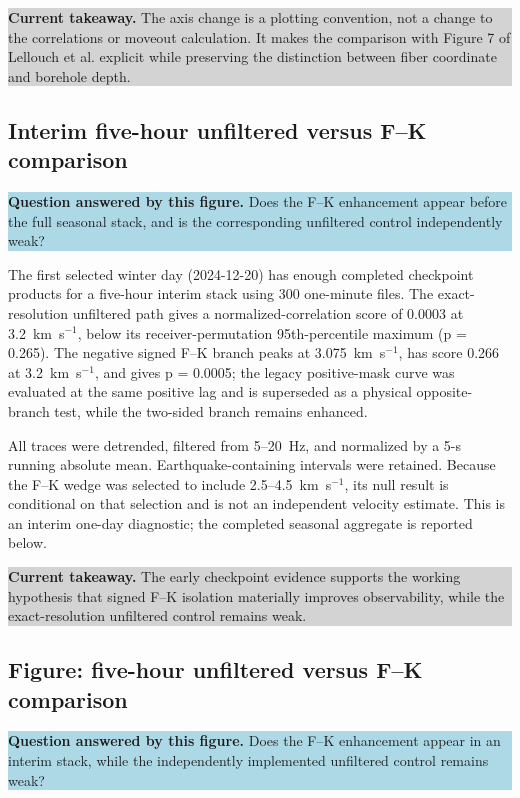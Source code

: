 \documentclass[11pt]{article}
\newcommand{\figquestion}[1]{\par\medskip\noindent\colorbox{lightblue}{\parbox{0.95\linewidth}{\textcolor{questionblue}{\textbf{Question answered by this figure.}} #1}}\par\medskip}
\newcommand{\takeaway}[1]{\par\smallskip\noindent\colorbox{lightgray}{\parbox{0.95\linewidth}{\textbf{Current takeaway.} #1}}\par\medskip}
\begin{document}
\takeaway{The axis change is a plotting convention, not a change to the correlations or moveout calculation. It makes the comparison with Figure 7 of Lellouch et al. explicit while preserving the distinction between fiber coordinate and borehole depth.}


\subsection{Interim five-hour unfiltered versus F--K comparison}
\figquestion{Does the F--K enhancement appear before the full seasonal stack, and is the corresponding unfiltered control independently weak?}

The first selected winter day (2024-12-20) has enough completed checkpoint products for a five-hour interim stack using 300 one-minute files. The exact-resolution unfiltered path gives a normalized-correlation score of 0.0003 at 3.2~km~s$^{-1}$, below its receiver-permutation 95th-percentile maximum (p = 0.265). The negative signed F--K branch peaks at 3.075~km~s$^{-1}$, has score 0.266 at 3.2~km~s$^{-1}$, and gives p = 0.0005; the legacy positive-mask curve was evaluated at the same positive lag and is superseded as a physical opposite-branch test, while the two-sided branch remains enhanced.

All traces were detrended, filtered from 5--20~Hz, and normalized by a 5-s running absolute mean. Earthquake-containing intervals were retained. Because the F--K wedge was selected to include 2.5--4.5~km~s$^{-1}$, its null result is conditional on that selection and is not an independent velocity estimate. This is an interim one-day diagnostic; the completed seasonal aggregate is reported below.

\takeaway{The early checkpoint evidence supports the working hypothesis that signed F--K isolation materially improves observability, while the exact-resolution unfiltered control remains weak.}


\subsection{Figure: five-hour unfiltered versus F--K comparison}
\figquestion{Does the F--K enhancement appear in an interim stack, while the independently implemented unfiltered control remains weak?}
\end{document}

